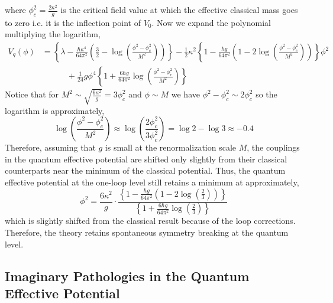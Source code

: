 \documentclass[12pt]{article}
\begin{document}
where $\phi_c^2 = \frac{2 \kappa^2}{g}$ is the critical field value at which the effective classical mass goes to zero i.e. it is the inflection point of $V_0$. 
Now we expand the polynomial multiplying the logarithm,
\begin{align*}
V_q(\phi) & = \left\{ \lambda - \frac{\hbar \kappa^4}{64\pi^2} \left( \frac{3}{2} - \log{\left( \frac{\phi^2 - \phi_c^2}{M^2} \right)} \right) \right\} 
- \frac{1}{2} \kappa^2 \left\{ 1 - \frac{\hbar g}{64 \pi^2} \left( 1 - 2 \log{\left( \frac{\phi^2 - \phi_c^2}{M^2} \right)} \right) \right\} \phi^2 
\\
& \quad \quad \quad + \frac{1}{24} g \phi^4 \left\{1 + \frac{6 \hbar g}{64 \pi^2} \log{\left( \frac{\phi^2 - \phi_c^2}{M^2} \right)} \right\}
\end{align*}
Notice that for $M^2 \sim \sqrt{\frac{6 \kappa^2}{g}} = 3 \phi_c^2$ and $\phi \sim M$ we have $\phi^2 - \phi_c^2 \sim 2 \phi_c^2$ so the logarithm is approximately,
\[  \log{\left( \frac{\phi^2 - \phi_c^2}{M^2} \right)} \approx \log{ \left( \frac{2 \phi_c^2}{3 \phi_c^2} \right)} = \log{2} - \log{3} \approx -0.4 \]
Therefore, assuming that $g$ is small at the renormalization scale $M$, the couplings in the quantum effective potential are shifted only slightly from their classical counterparts near the minimum of the classical potential. Thus, the quantum effective potential at the one-loop level still retains a minimum at approximately,
\[ \phi^2 = \frac{6 \kappa^2}{g} \cdot \frac{\left\{ 1 - \frac{\hbar g}{64 \pi^2} \left( 1 - 2 \log{\left(\frac{2}{3} \right)} \right) \right\}}{\left\{1 + \frac{6 \hbar g}{64 \pi^2} \log{\left( \frac{2}{3} \right)} \right\}} \]
which is slightly shifted from the classical result because of the loop corrections. Therefore, the theory retains spontaneous symmetry breaking at the quantum level. 

\subsection{Imaginary Pathologies in the Quantum Effective Potential}
\end{document}
